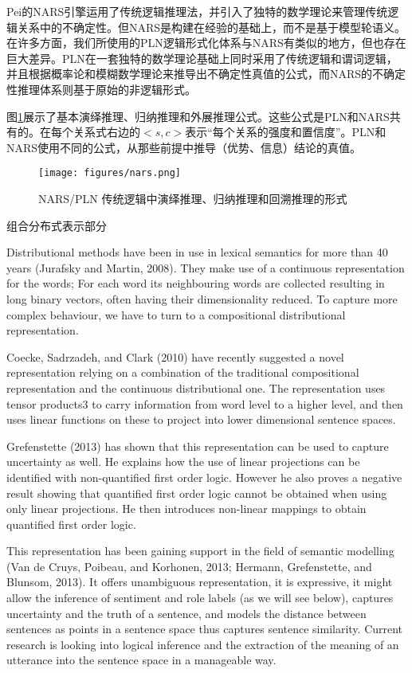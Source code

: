      Pei的NARS\cite{Wang2006}引擎运用了传统逻辑推理法，并引入了独特的数学理论来管理传统逻辑关系中的不确定性。但NARS是构建在经验的基础上，而不是基于模型轮语义。 在许多方面，我们所使用的PLN逻辑形式化体系与NARS有类似的地方，但也存在巨大差异。PLN在一套独特的数学理论基础上同时采用了传统逻辑和谓词逻辑，并且根据概率论和模糊数学理论来推导出不确定性真值的公式，而NARS的不确定性推理体系则基于原始的非逻辑形式。

     图\ref{fig:nars}展示了基本演绎推理、归纳推理和外展推理公式。这些公式是PLN和NARS共有的。在每个关系式右边的$<s,c>$表示“每个关系的强度和置信度”。PLN和NARS使用不同的公式，从那些前提中推导（优势、信息）结论的真值。

\begin{figure}[htb]
\centering
\texttt{[image: figures/nars.png]}
\caption{ NARS/PLN 传统逻辑中演绎推理、归纳推理和回溯推理的形式 }
\label{fig:nars}
\end{figure}
 

组合分布式表示部分

Distributional methods have been in use in lexical semantics for more than 40
years (Jurafsky and Martin, 2008). They make use of a continuous representation for the words; For each word its neighbouring words are collected resulting
in long binary vectors, often having their dimensionality reduced. 
To capture more complex behaviour, we have to turn to a compositional distributional
representation.

Coecke, Sadrzadeh, and Clark (2010) have recently suggested a novel representation
relying on a combination of the traditional compositional representation
and the continuous distributional one. The representation uses tensor products3
to carry information from word
level to a higher level, and then uses linear functions on these to project into
lower dimensional sentence spaces.

Grefenstette (2013) has shown that this representation can be used to capture
uncertainty as well. He explains how the use of linear projections can be
identified with non-quantified first order logic. However he also proves a negative
result showing that quantified first order logic cannot be obtained when
using only linear projections. He then introduces non-linear mappings to obtain
quantified first order logic.

This representation has been gaining support in the field of semantic modelling
(Van de Cruys, Poibeau, and Korhonen, 2013; Hermann, Grefenstette, and Blunsom,
2013). It offers unambiguous representation, it is expressive, it might allow the
inference of sentiment and role labels (as we will see below), captures uncertainty
and the truth of a sentence, and models the distance between sentences
as points in a sentence space thus captures sentence similarity. Current research
is looking into logical inference and the extraction of the meaning of an
utterance into the sentence space in a manageable way.

